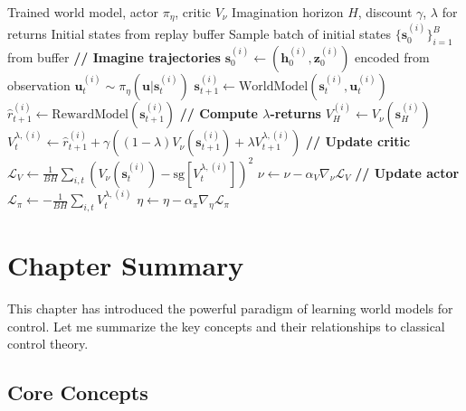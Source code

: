 \begin{algorithm}[H]
\caption{Dreamer Policy Optimization}
\begin{algorithmic}[1]
\Require Trained world model, actor $\pi_\eta$, critic $V_\nu$
\Require Imagination horizon $H$, discount $\gamma$, $\lambda$ for returns
\Require Initial states from replay buffer
    \State Sample batch of initial states $\{\mathbf{s}_0^{(i)}\}_{i=1}^B$ from buffer
    \State \textbf{// Imagine trajectories}
        \State $\mathbf{s}_0^{(i)} \gets (\mathbf{h}_0^{(i)}, \mathbf{z}_0^{(i)})$ encoded from observation
            \State $\mathbf{u}_t^{(i)} \sim \pi_\eta(\mathbf{u} | \mathbf{s}_t^{(i)})$
            \State $\mathbf{s}_{t+1}^{(i)} \gets \text{WorldModel}(\mathbf{s}_t^{(i)}, \mathbf{u}_t^{(i)})$
            \State $\hat{r}_{t+1}^{(i)} \gets \text{RewardModel}(\mathbf{s}_{t+1}^{(i)})$
        \EndFor
    \EndFor
    \State \textbf{// Compute $\lambda$-returns}
        \State $V_H^{(i)} \gets V_\nu(\mathbf{s}_H^{(i)})$
            \State $V_t^{\lambda,(i)} \gets \hat{r}_{t+1}^{(i)} + \gamma \left((1-\lambda) V_\nu(\mathbf{s}_{t+1}^{(i)}) + \lambda V_{t+1}^{\lambda,(i)}\right)$
        \EndFor
    \EndFor
    \State \textbf{// Update critic}
    \State $\mathcal{L}_V \gets \frac{1}{BH} \sum_{i,t} (V_\nu(\mathbf{s}_t^{(i)}) - \text{sg}[V_t^{\lambda,(i)}])^2$
    \State $\nu \gets \nu - \alpha_V \nabla_\nu \mathcal{L}_V$
    \State \textbf{// Update actor}
    \State $\mathcal{L}_\pi \gets -\frac{1}{BH} \sum_{i,t} V_t^{\lambda,(i)}$
    \State $\eta \gets \eta - \alpha_\pi \nabla_\eta \mathcal{L}_\pi$
\EndProcedure
\end{algorithmic}
\end{algorithm}

\section{Chapter Summary}
\label{sec:world_models_summary}

This chapter has introduced the powerful paradigm of learning world models for control. Let me summarize the key concepts and their relationships to classical control theory.

\subsection{Core Concepts}

